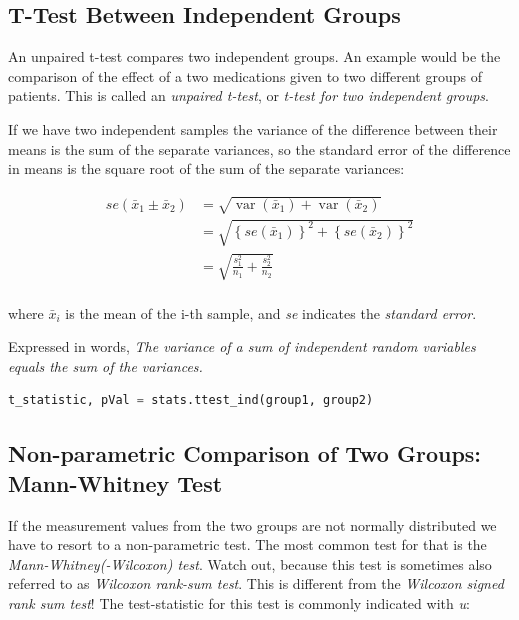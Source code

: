 \subsection{T-Test Between Independent Groups} 
An \gls{unpaired} t-test compares two independent groups. An example would be the comparison of the effect of a two medications given to two different groups of patients. This is called an \emph{unpaired t-test}, or \emph{t-test for two independent groups}.

If we have two independent samples the variance of the difference between their means is the sum of the separate variances, so the standard error of the difference in means is the square root of the sum of the separate variances:

\begin{align*}
   se({{\bar x}_1} \pm {{\bar x}_2}) &= \sqrt {\operatorname{var} ({{\bar x}_1}) + \operatorname{var} ({{\bar x}_2})}  \\
   &= \sqrt {{{\left\{ {se({{\bar x}_1})} \right\}}^2} + {{\left\{ {se({{\bar x}_2})} \right\}}^2}}  \\
   &= \sqrt {\frac{{s_1^2}}{{{n_1}}} + \frac{{s_2^2}}{{{n_2}}}}  \\
\end{align*}

where $\bar{x}_i$ is the mean of the i-th sample, and \emph{se} indicates the \emph{standard error}.

Expressed in words, \emph{The variance of a sum of independent random variables equals the sum of the variances.}

\begin{lstlisting}[language=Python]
    t_statistic, pVal = stats.ttest_ind(group1, group2)
\end{lstlisting}

\subsection{Non-parametric Comparison of Two Groups: Mann-Whitney Test} \label{test:Mann-Whitney}

If the measurement values from the two groups are not normally distributed we have to resort to a non-parametric test. The most common test for that is the \emph{Mann-Whitney(-Wilcoxon) test}. Watch out, because this test is sometimes also referred to as \emph{Wilcoxon rank-sum test}. This is different from the \emph{Wilcoxon signed rank sum test}!
The test-statistic for this test is commonly indicated with \emph{u}:

